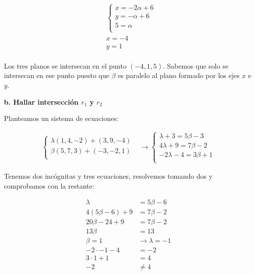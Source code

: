 \documentclass[12pt]{article}
\begin{document}
\begin{align*}
   & \begin{cases}
       x = -2\alpha + 6 \\
       y = -\alpha + 6  \\
       5 = \alpha       \\
     \end{cases} \\
   & \boxed{x = -4}   \\
   & \boxed{y = 1}    \\
\end{align*}

Los tres planos se intersecan en el punto \((-4,1,5)\).
Sabemos que solo se intersecan en ese punto puesto que \(\beta\) es paralelo
al plano formado por los ejes \(x\) e \(y\).

\textbf{b. Hallar intersección \(r_{1}\) y \(r_{2}\)}

Planteamos un sistema de ecuaciones:

\begin{align*}
  \begin{cases}
    \lambda (1,4,-2) + (3,9,-4) \\
    \beta(5,7,3) + (-3,-2,1)    \\
  \end{cases}
   & \rightarrow
  \begin{cases}
    \lambda + 3 = 5\beta - 3   \\
    4\lambda + 9 = 7\beta - 2  \\
    -2\lambda - 4 = 3\beta + 1 \\
  \end{cases}
\end{align*}

Tenemos dos incógnitas y tres ecuaciones,
resolvemos tomando dos y comprobamos con la restante:

\begin{align*}
  \lambda           & = 5\beta -6                      \\
  4(5\beta -6) + 9  & = 7\beta - 2                     \\
  20\beta - 24 + 9  & = 7\beta - 2                     \\
  13\beta           & = 13                             \\
  \boxed{\beta = 1} & \rightarrow \boxed{\lambda = -1} \\
  -2 \cdot -1 - 4   & = -2                             \\
  3 \cdot 1 + 1     & = 4                              \\
  -2                & \neq 4                           \\
\end{align*}
\end{document}
